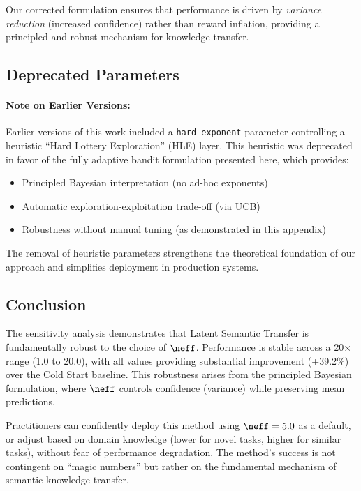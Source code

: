 Our corrected formulation ensures that performance is driven by \emph{variance reduction} 
(increased confidence) rather than reward inflation, providing a principled and robust 
mechanism for knowledge transfer.

\subsection{Deprecated Parameters}

\paragraph{Note on Earlier Versions:} Earlier versions of this work included a 
\texttt{hard\_exponent} parameter controlling a heuristic ``Hard Lottery Exploration'' 
(HLE) layer. This heuristic was deprecated in favor of the fully adaptive bandit 
formulation presented here, which provides:
\begin{itemize}[leftmargin=*,noitemsep]
    \item Principled Bayesian interpretation (no ad-hoc exponents)
    \item Automatic exploration-exploitation trade-off (via UCB)
    \item Robustness without manual tuning (as demonstrated in this appendix)
\end{itemize}

The removal of heuristic parameters strengthens the theoretical foundation of our 
approach and simplifies deployment in production systems.

\subsection{Conclusion}

The sensitivity analysis demonstrates that Latent Semantic Transfer is fundamentally 
robust to the choice of $\neff$. Performance is stable across a 20$\times$ 
range (1.0 to 20.0), with all values providing substantial improvement (+39.2\%) 
over the Cold Start baseline. This robustness arises from the principled Bayesian 
formulation, where $\neff$ controls confidence (variance) while preserving 
mean predictions.

Practitioners can confidently deploy this method using $\neff=5.0$ as a 
default, or adjust based on domain knowledge (lower for novel tasks, higher for 
similar tasks), without fear of performance degradation. The method's success is 
not contingent on ``magic numbers'' but rather on the fundamental mechanism of 
semantic knowledge transfer.

